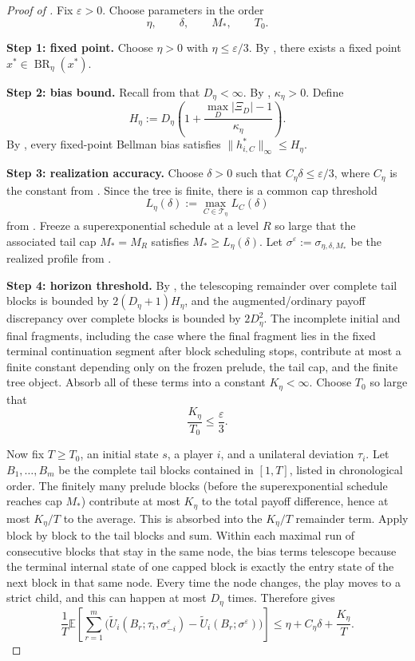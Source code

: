 \documentclass[12pt]{article}
\theoremstyle{definition}
\newcommand{\eps}{\varepsilon}
\newcommand{\E}{\mathbb{E}}
\newcommand{\1}{\mathbf{1}}
\newcommand{\cT}{\mathcal{T}}
\DeclareMathOperator{\BR}{BR}
\begin{document}
\begin{proof}[Proof of ]
Fix $\eps>0$. Choose parameters in the order
\[
\eta,\qquad \delta,\qquad M_*,\qquad T_0.
\]

\smallskip
\noindent\textbf{Step 1: fixed point.}
Choose $\eta>0$ with $\eta\le \eps/3$. By
, there exists a fixed point $x^*\in\BR_\eta(x^*)$.

\smallskip
\noindent\textbf{Step 2: bias bound.}
Recall from  that $D_\eta<\infty$. By
, $\kappa_\eta>0$. Define
\[
H_\eta:=D_\eta\left(1+\frac{\max_D|\Xi_D|-1}{\kappa_\eta}\right).
\]
By , every fixed-point Bellman bias satisfies
$\|h_{i,C}^*\|_\infty\le H_\eta$.

\smallskip
\noindent\textbf{Step 3: realization accuracy.}
Choose $\delta>0$ such that $C_\eta\delta\le \eps/3$, where $C_\eta$ is the
constant from . Since the tree is finite, there is a common
cap threshold
\[
L_\eta(\delta):=\max_{C\in\cT_\eta}L_C(\delta)
\]
from . Freeze a superexponential schedule at a level
$R$ so large that the associated tail cap $M_*=M_R$ satisfies
$M_*\ge L_\eta(\delta)$. Let
$\sigma^\eps:=\sigma_{\eta,\delta,M_*}$ be the realized profile from
.

\smallskip
\noindent\textbf{Step 4: horizon threshold.}
By , the telescoping remainder over complete tail blocks is
bounded by $2(D_\eta+1)H_\eta$, and the augmented/ordinary payoff discrepancy over
complete blocks is bounded by $2D_\eta^2$. The incomplete initial and final
fragments, including the case where the final fragment lies in the fixed
terminal continuation segment after block scheduling stops, contribute at most a
finite constant depending only on the frozen prelude, the tail cap, and the
finite tree object. Absorb all of these terms into a constant $K_\eta<\infty$.
Choose $T_0$ so large that
\[
\frac{K_\eta}{T_0}\le \frac{\eps}{3}.
\]

Now fix $T\ge T_0$, an initial state $s$, a player $i$, and a unilateral deviation
$\tau_i$. Let $B_1,\dots,B_m$ be the complete tail blocks contained in $[1,T]$,
listed in chronological order. The finitely many prelude blocks (before the
superexponential schedule reaches cap $M_*$) contribute at most $K_\eta$ to the
total payoff difference, hence at most $K_\eta/T$ to the average. This is
absorbed into the $K_\eta/T$ remainder term. Apply  block
by block to the
tail blocks and sum. Within each maximal run of consecutive blocks that stay in
the same node, the bias terms telescope because the terminal internal state of one
capped block is exactly the entry state of the next block in that same node. Every
time the node changes, the play moves to a strict child, and this can happen at
most $D_\eta$ times. Therefore  gives
\[
\frac1T\E\left[\sum_{r=1}^m
\bigl(
\widetilde U_i(B_r;\tau_i,\sigma^\eps_{-i})
-
\widetilde U_i(B_r;\sigma^\eps)
\bigr)\right]
\le
\eta + C_\eta\delta + \frac{K_\eta}{T}.
\]


\end{proof}
\end{document}
